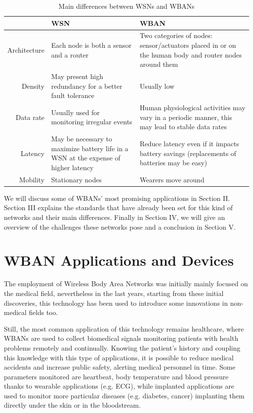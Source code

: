 \documentclass[conference]{IEEEtran}
\begin{document}
\begin{table}[htbp]
	\caption{Main differences between WSNs and WBANs}
	\begin{tabularx}{0.5\textwidth}{r|X|X|}
	 & \textbf{WSN} & \textbf{WBAN} \\
	\hline
	Architecture & Each node is both a sensor and a router & Two categories of nodes: sensor/actuators placed in or on the human body and router nodes around them \\
	\hline
	Density & May present high redundancy for a better fault tolerance & Usually low \\
	\hline
	Data rate & Usually used for monitoring irregular events & Human physiological activities may vary in a periodic manner, this may lead to stable data rates \\
	\hline
	Latency	& May be necessary to maximize battery life in a WSN at the expense of higher latency & Reduce latency even if it impacts battery savings (replacements of batteries may be easy) \\
	\hline
	Mobility & Stationary nodes & Wearers move around \\
	\hline
	\end{tabularx}
	\label{tab1}
	\end{table}

We will discuss some of WBANs' most promising applications in Section II. Section III explains the standards that have already been set for this kind of networks and their main differences. Finally in Section IV, we will give an overview of the challenges these networks pose and a conclusion in Section V.


\section{WBAN Applications and Devices}
The employment of Wireless Body Area Networks was initially mainly focused on the medical field, nevertheless in the last years, starting from these initial discoveries, this technology has been used to introduce some innovations in non-medical fields too.

Still, the most common application of this technology remains healthcare, where WBANs are used to collect biomedical signals monitoring patients with health problems remotely and continually. 
Knowing the patient's history and coupling this knowledge with this type of applications, it is possible to reduce medical accidents and increase public safety, alerting medical personnel in time. Some parameters monitored are heartbeat, body temperature and blood pressure thanks to wearable applications (e.g. ECG), while implanted applications are used to monitor more particular diseases (e.g. diabetes, cancer) implanting them directly under the skin or in the bloodstream.
\end{document}
